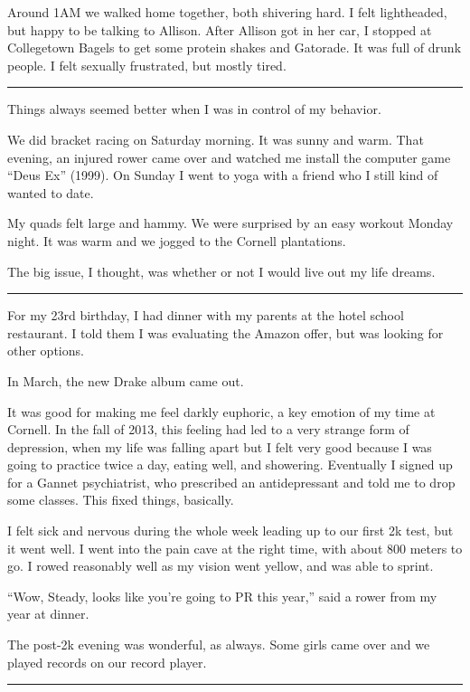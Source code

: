 Around 1AM we walked home together, both shivering hard.  I felt lightheaded,
but happy to be talking to Allison.  After Allison got in her car, I stopped at
Collegetown Bagels to get some protein shakes and Gatorade.  It was full of
drunk people.  I felt sexually frustrated, but mostly tired.

\plainfancybreak{12pt}{2}{* * *}

Things always seemed better when I was in control of my behavior.

We did bracket racing on Saturday morning.  It was sunny and warm.  That
evening, an injured rower came over and watched me install the computer game
``Deus Ex'' (1999).   On Sunday I went to yoga with a friend who I still kind of
wanted to date.

My quads felt large and hammy.  We were surprised by an easy workout Monday
night.  It was warm and we jogged to the Cornell plantations.

The big issue, I thought, was whether or not I would live out my life dreams.

\plainfancybreak{12pt}{2}{* * *}

For my 23rd birthday, I had dinner with my parents at the hotel school
restaurant.  I told them I was evaluating the Amazon offer, but was looking for
other options.

In March, the new Drake album came out.

It was good for making me feel darkly euphoric, a key emotion of my time at
Cornell.  In the fall of 2013, this feeling had led to a very strange form of
depression, when my life was falling apart but I felt very good because I was
going to practice twice a day, eating well, and showering.  Eventually I signed
up for a Gannet psychiatrist, who prescribed an antidepressant and told me to
drop some classes.  This fixed things, basically. 

I felt sick and nervous during the whole week leading up to our first 2k test,
but it went well.  I went into the pain cave at the right time, with about 800
meters to go.  I rowed reasonably well as my vision went yellow, and was able to
sprint.  

``Wow, Steady, looks like you're going to PR this year,'' said a rower from my
year at dinner.  

The post-2k evening was wonderful, as always.  Some girls came over and we
played records on our record player.  

\plainfancybreak{12pt}{2}{* * *}


